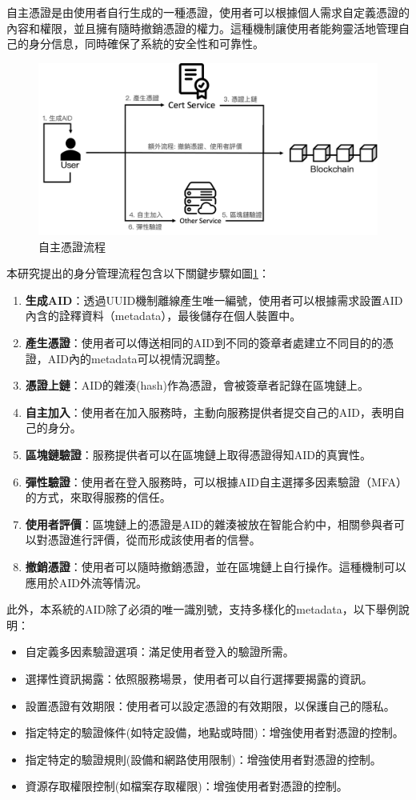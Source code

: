 自主憑證是由使用者自行生成的一種憑證，使用者可以根據個人需求自定義憑證的內容和權限，並且擁有隨時撤銷憑證的權力。這種機制讓使用者能夠靈活地管理自己的身分信息，同時確保了系統的安全性和可靠性。
\begin{figure}
  \centering
  \includegraphics[width=\linewidth,keepaspectratio]{figures/flow-sc.png}
  \caption{自主憑證流程}
  \label{fig:flow-sc}
\end{figure}
本研究提出的身分管理流程包含以下關鍵步驟如圖\ref{fig:flow-sc}：
\begin{enumerate}
  \item \textbf{生成AID}：透過UUID\cite{uuid}機制離線產生唯一編號，使用者可以根據需求設置AID內含的詮釋資料（metadata），最後儲存在個人裝置中。
  \item \textbf{產生憑證}：使用者可以傳送相同的AID到不同的簽章者處建立不同目的的憑證，AID內的metadata可以視情況調整。
  \item \textbf{憑證上鏈}：AID的雜湊(hash)作為憑證，會被簽章者記錄在區塊鏈上。
  \item \textbf{自主加入}：使用者在加入服務時，主動向服務提供者提交自己的AID，表明自己的身分。
  \item \textbf{區塊鏈驗證}：服務提供者可以在區塊鏈上取得憑證得知AID的真實性。
  \item \textbf{彈性驗證}：使用者在登入服務時，可以根據AID自主選擇多因素驗證（MFA）的方式，來取得服務的信任。
  \item \textbf{使用者評價}：區塊鏈上的憑證是AID的雜湊被放在智能合約中，相關參與者可以對憑證進行評價，從而形成該使用者的信譽。
  \item \textbf{撤銷憑證}：使用者可以隨時撤銷憑證，並在區塊鏈上自行操作。這種機制可以應用於AID外流等情況。
\end{enumerate}
此外，本系統的AID除了必須的唯一識別號，支持多樣化的metadata，以下舉例說明：
\begin{itemize}
  \item 自定義多因素驗證選項：滿足使用者登入的驗證所需。
  \item 選擇性資訊揭露：依照服務場景，使用者可以自行選擇要揭露的資訊。
  \item 設置憑證有效期限：使用者可以設定憑證的有效期限，以保護自己的隱私。
  \item 指定特定的驗證條件(如特定設備，地點或時間)：增強使用者對憑證的控制。
  \item 指定特定的驗證規則(設備和網路使用限制)：增強使用者對憑證的控制。
  \item 資源存取權限控制(如檔案存取權限)：增強使用者對憑證的控制。
\end{itemize}

